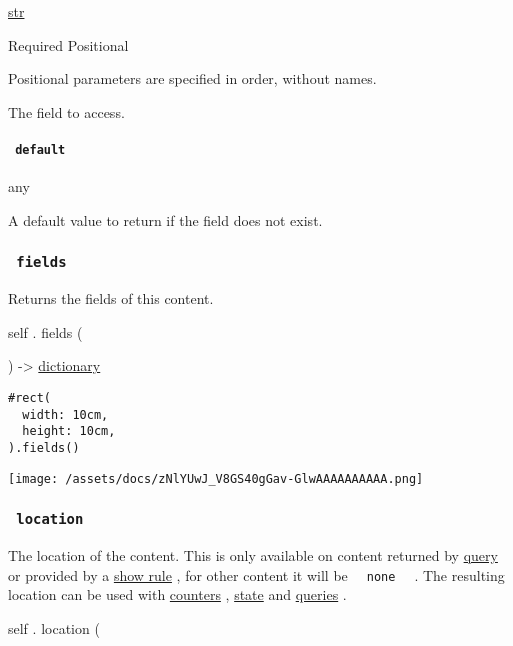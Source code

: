 \href{/docs/reference/foundations/str/}{str}

{Required} {{ Positional }}

\label{definitions-at-field-positional-tooltip}
Positional parameters are specified in order, without names.

The field to access.

\paragraph{\texorpdfstring{\texttt{\ default\ }}{ default }}\label{definitions-at-default}

{ any }

A default value to return if the field does not exist.

\subsubsection{\texorpdfstring{\texttt{\ fields\ }}{ fields }}\label{definitions-fields}

Returns the fields of this content.

self { . } { fields } (

) -\textgreater{}
\href{/docs/reference/foundations/dictionary/}{dictionary}

\begin{verbatim}
#rect(
  width: 10cm,
  height: 10cm,
).fields()
\end{verbatim}

\texttt{[image: /assets/docs/zNlYUwJ\_V8GS40gGav-GlwAAAAAAAAAA.png]}

\subsubsection{\texorpdfstring{\texttt{\ location\ }}{ location }}\label{definitions-location}

The location of the content. This is only available on content returned
by \href{/docs/reference/introspection/query/}{query} or provided by a
\href{/docs/reference/styling/\#show-rules}{show rule} , for other
content it will be \texttt{\ }{\texttt{\ none\ }}\texttt{\ } . The
resulting location can be used with
\href{/docs/reference/introspection/counter/}{counters} ,
\href{/docs/reference/introspection/state/}{state} and
\href{/docs/reference/introspection/query/}{queries} .

self { . } { location } (


